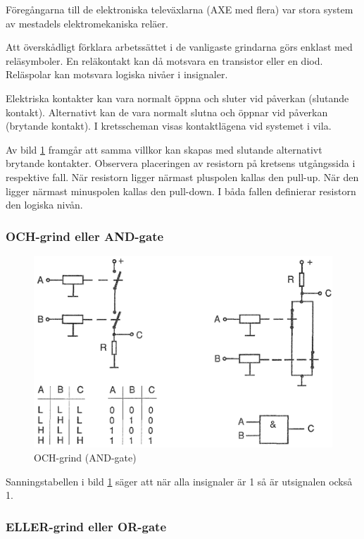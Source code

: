 Föregångarna till de elektroniska televäxlarna (AXE med flera) var
stora system av mestadels elektromekaniska reläer.

Att överskådligt förklara arbetssättet i de vanligaste grindarna görs
enklast med reläsymboler. En reläkontakt kan då motsvara en transistor
eller en diod. Reläspolar kan motsvara logiska nivåer i insignaler.

Elektriska kontakter kan vara normalt öppna och sluter vid påverkan
(slutande kontakt). Alternativt kan de vara normalt slutna och öppnar
vid påverkan (brytande kontakt). I kretsscheman visas kontaktlägena
vid systemet i vila.

Av bild \ref{fig:BildII2-37} framgår att samma villkor kan skapas med
slutande alternativt brytande kontakter. Observera placeringen av
resistorn på kretsens utgångssida i respektive fall. När resistorn
ligger närmast pluspolen kallas den pull-up. När den ligger närmast
minuspolen kallas den pull-down. I båda fallen definierar resistorn
den logiska nivån.

\subsubsection{OCH-grind eller AND-gate}

\begin{figure}
\includegraphics[width=\textwidth]{images/cropped_pdfs/bild_2_2-37.pdf}
\caption{OCH-grind (AND-gate)}
\label{fig:BildII2-37}
\end{figure}

Sanningstabellen i bild \ref{fig:BildII2-37} säger att när alla insignaler
är 1 så är utsignalen också 1.

\subsubsection{ELLER-grind eller OR-gate}

